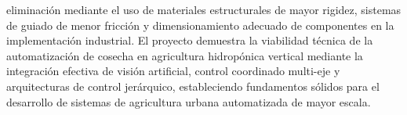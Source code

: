 eliminación mediante el uso de materiales estructurales de mayor rigidez, sistemas de guiado de menor fricción y dimensionamiento adecuado de componentes en la implementación industrial. El proyecto demuestra la viabilidad técnica de la automatización de cosecha en agricultura hidropónica vertical mediante la integración efectiva de visión artificial, control coordinado multi-eje y arquitecturas de control jerárquico, estableciendo fundamentos sólidos para el desarrollo de sistemas de agricultura urbana automatizada de mayor escala.